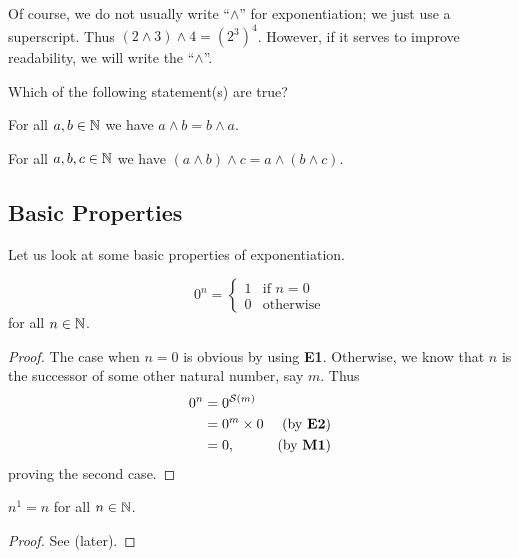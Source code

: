Of course, we do not usually write ``$\wedge$'' for exponentiation; we just use a superscript. Thus $(2 \wedge 3) \wedge 4 = \left(2^3\right)^4$. However, if it serves to improve readability, we will write the ``$\wedge$''.

\begin{exercise}
    Which of the following statement(s) are true?
    \begin{partquestions}{\alph*}
        \item For all $a, b \in \mathbb{N}$ we have $a \wedge b = b \wedge a$.
        \item For all $a, b, c \in \mathbb{N}$ we have $(a \wedge b) \wedge c = a \wedge (b \wedge c)$.
    \end{partquestions}
\end{exercise}

\subsection{Basic Properties}
Let us look at some basic properties of exponentiation.

\begin{proposition}
    \[
        0^n = \begin{cases}
            1 & \text{if } n = 0\\
            0 & \text{otherwise}
        \end{cases}
    \]
    for all $n \in \mathbb{N}$.
\end{proposition}
\begin{proof}
    The case when $n = 0$ is obvious by using \textbf{E1}. Otherwise, we know that $n$ is the successor of some other natural number, say $m$. Thus
    \begin{align*}
        0^n &= 0^{\mathcal{S}(m)}\\
        &= 0^m \times 0 & (\text{by \textbf{E2}})\\
        &= 0, & (\text{by \textbf{M1}})
    \end{align*}
    proving the second case.
\end{proof}

\begin{proposition}\label{prop:power-of-1}
    $n^1 = n$ for all $n \in \mathbb{N}$.
\end{proposition}
\begin{proof}
    See  (later).
\end{proof}

